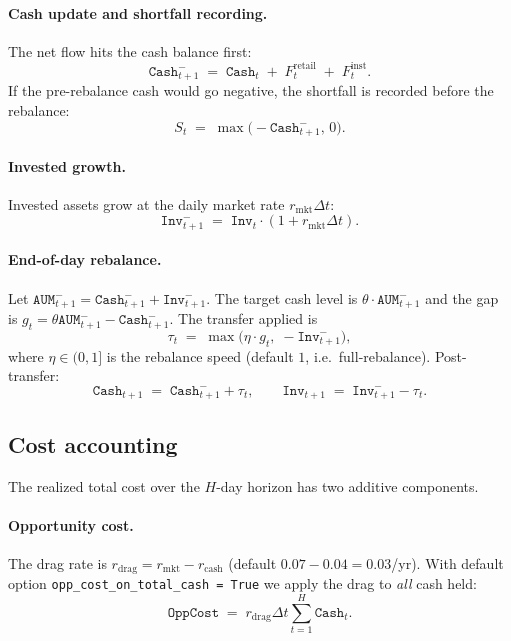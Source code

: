 \documentclass[11pt]{article}
\newcommand{\Cstar}{\theta}
\newcommand{\code}[1]{\texttt{#1}}
\begin{document}
\paragraph{Cash update and shortfall recording.} The net flow hits the cash
balance first:
\[
  \code{Cash}_{t+1}^{-} \;=\; \code{Cash}_t \;+\; F^{\mathrm{retail}}_t \;+\; F^{\mathrm{inst}}_t.
\]
If the pre-rebalance cash would go negative, the shortfall is recorded
before the rebalance:
\[
  S_t \;=\; \max\!\bigl(-\code{Cash}_{t+1}^{-},\, 0\bigr).
\]

\paragraph{Invested growth.} Invested assets grow at the daily market rate
$r_{\mathrm{mkt}} \Delta t$:
\[
  \code{Inv}_{t+1}^{-} \;=\; \code{Inv}_t \cdot (1 + r_{\mathrm{mkt}} \Delta t).
\]

\paragraph{End-of-day rebalance.} Let $\code{AUM}_{t+1}^{-} =
\code{Cash}_{t+1}^{-} + \code{Inv}_{t+1}^{-}$. The target cash level is
$\Cstar \cdot \code{AUM}_{t+1}^{-}$ and the gap is $g_t = \Cstar
\code{AUM}_{t+1}^{-} - \code{Cash}_{t+1}^{-}$. The transfer applied is
\[
  \tau_t \;=\; \max\!\bigl(\eta \cdot g_t,\; -\code{Inv}_{t+1}^{-}\bigr),
\]
where $\eta \in (0,1]$ is the rebalance speed (default $1$, i.e.\
full-rebalance). Post-transfer:
\[
  \code{Cash}_{t+1} \;=\; \code{Cash}_{t+1}^{-} + \tau_t, \qquad
  \code{Inv}_{t+1} \;=\; \code{Inv}_{t+1}^{-} - \tau_t.
\]

\subsection{Cost accounting}
\label{sec:sim:costs}

The realized total cost over the $H$-day horizon has two additive
components.

\paragraph{Opportunity cost.} The drag rate is
$r_{\mathrm{drag}} = r_{\mathrm{mkt}} - r_{\mathrm{cash}}$ (default
$0.07 - 0.04 = 0.03$/yr). With default option \code{opp\_cost\_on\_total\_cash
= True} we apply the drag to \emph{all} cash held:
\[
  \code{OppCost} \;=\; r_{\mathrm{drag}} \Delta t \sum_{t=1}^{H} \code{Cash}_t.
\]
\end{document}
